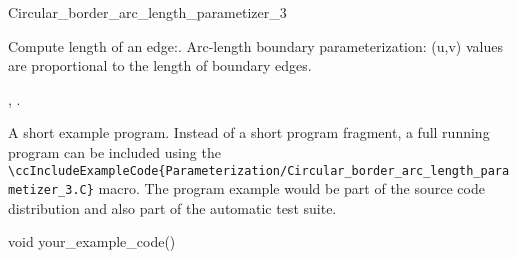 \begin{ccRefClass}{Circular_border_arc_length_parametizer_3}
\ccCreation
{}  %



\ccOperations

{
Compute length of an edge:.
Arc-length boundary parameterization: (u,v) values are proportional to the length of boundary edges.
}


\ccSeeAlso

,
.

\ccExample

A short example program.
Instead of a short program fragment, a full running program can be
included using the 
\verb|\ccIncludeExampleCode{Parameterization/Circular_border_arc_length_parametizer_3.C}| 
macro. The program example would be part of the source code distribution and
also part of the automatic test suite.

\begin{ccExampleCode}
void your_example_code() {
}
\end{ccExampleCode}


\end{ccRefClass}


